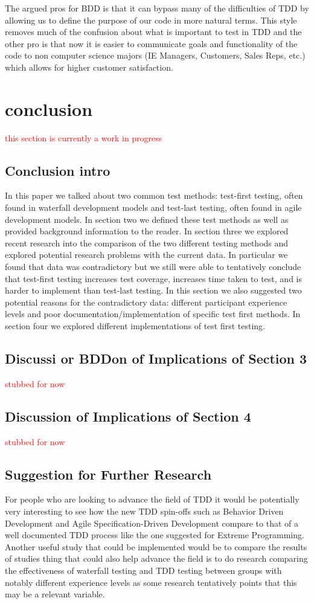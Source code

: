 \documentclass{sig-alternate}
\newcommand{\mycomment}[1]{\textcolor{red}{#1}}
\begin{document}
The argued pros for BDD is that it can bypass many of the difficulties of TDD by allowing us to define the purpose of our code in more natural terms. This style removes much of the confusion about what is important to test in TDD and the other pro is that now it is easier to communicate goals and functionality of the code to non computer science majors (IE Managers, Customers, Sales Reps, etc.) which allows for higher customer satisfaction.

\section{conclusion}
\mycomment{this section is currently a work in progress}
\subsection{Conclusion intro}

In this paper we talked about two common test methods: test-first testing, often found in waterfall development models and test-last testing, often found in agile development models.  In section two we defined these test methods as well as provided background information to the reader.  In section three we explored recent research into the comparison of the two different testing methods and explored potential research problems with the current data.  In particular we found that data was contradictory but we still were able to tentatively conclude that test-first testing increases test coverage, increases time taken to test, and is harder to implement than test-last testing.  In this section we also suggested two potential reasons for the contradictory data: different participant experience levels and poor documentation/implementation of specific test first methods. In section four we explored different implementations of test first testing.  

\subsection{Discussi or BDDon of Implications of Section 3}
\mycomment{stubbed for now}

\subsection{Discussion of Implications of Section 4}
\mycomment{stubbed for now}
\subsection{Suggestion for Further Research}
For people who are looking to advance the field of TDD it would be potentially very interesting to see how the new TDD spin-offs such as Behavior Driven Development and Agile Specification-Driven Development compare to that of a well documented TDD process like the one suggested for Extreme Programming.  Another useful study that could be implemented would be to compare the results of studies thing that could also help advance the field is to do research comparing the effectiveness of waterfall testing and TDD testing between groups with notably different experience levels as some research tentatively points that this may be a relevant variable.
\end{document}
